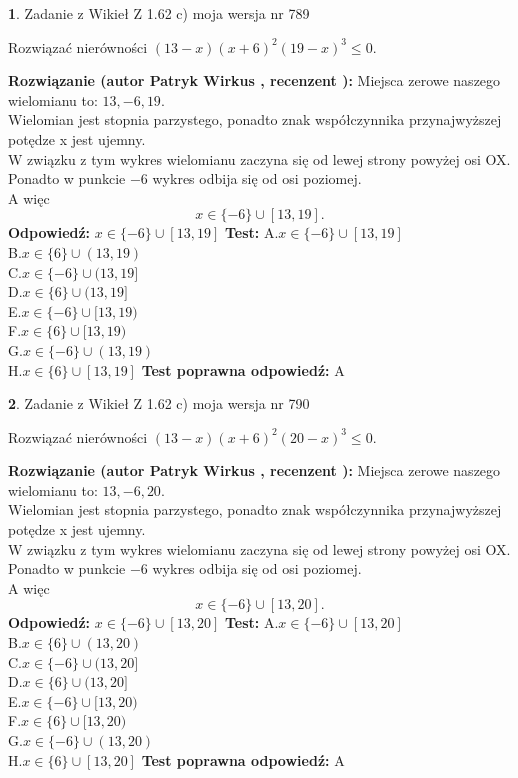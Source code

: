 \documentclass[12pt, a4paper]{article}
\theoremstyle{definition} %
\newtheorem{zad}{}
\newcommand{\zadStart}[1]{\begin{zad}#1\newline}
\newcommand{\zadStop}{\end{zad}}
\newcommand{\rozwStart}[2]{\noindent \textbf{Rozwiązanie (autor #1 , recenzent #2): }\newline}
\newcommand{\rozwStop}{\newline}
\newcommand{\odpStart}{\noindent \textbf{Odpowiedź:}\newline}
\newcommand{\odpStop}{\newline}
\newcommand{\testStart}{\noindent \textbf{Test:}\newline}
\newcommand{\testStop}{\newline}
\newcommand{\kluczStart}{\noindent \textbf{Test poprawna odpowiedź:}\newline}
\newcommand{\kluczStop}{\newline}
\begin{document}
\zadStart{Zadanie z Wikieł Z 1.62 c) moja wersja nr 789}

Rozwiązać nierówności $(13-x)(x+6)^{2}(19-x)^{3}\le0$.
\zadStop
\rozwStart{Patryk Wirkus}{}
Miejsca zerowe naszego wielomianu to: $13, -6, 19$.\\
Wielomian jest stopnia parzystego, ponadto znak współczynnika przy\linebreak najwyższej potędze x jest ujemny.\\ W związku z tym wykres wielomianu zaczyna się od lewej strony powyżej osi OX.\\
Ponadto w punkcie $-6$ wykres odbija się od osi poziomej.\\
A więc $$x \in \{-6\} \cup [13,19].$$
\rozwStop
\odpStart
$x \in \{-6\} \cup [13,19]$
\odpStop
\testStart
A.$x \in \{-6\} \cup [13,19]$\\
B.$x \in \{6\} \cup (13,19)$\\
C.$x \in \{-6\} \cup (13,19]$\\
D.$x \in \{6\} \cup (13,19]$\\
E.$x \in \{-6\} \cup [13,19)$\\
F.$x \in \{6\} \cup [13,19)$\\
G.$x \in \{-6\} \cup (13,19)$\\
H.$x \in \{6\} \cup [13,19]$
\testStop
\kluczStart
A
\kluczStop



\zadStart{Zadanie z Wikieł Z 1.62 c) moja wersja nr 790}

Rozwiązać nierówności $(13-x)(x+6)^{2}(20-x)^{3}\le0$.
\zadStop
\rozwStart{Patryk Wirkus}{}
Miejsca zerowe naszego wielomianu to: $13, -6, 20$.\\
Wielomian jest stopnia parzystego, ponadto znak współczynnika przy\linebreak najwyższej potędze x jest ujemny.\\ W związku z tym wykres wielomianu zaczyna się od lewej strony powyżej osi OX.\\
Ponadto w punkcie $-6$ wykres odbija się od osi poziomej.\\
A więc $$x \in \{-6\} \cup [13,20].$$
\rozwStop
\odpStart
$x \in \{-6\} \cup [13,20]$
\odpStop
\testStart
A.$x \in \{-6\} \cup [13,20]$\\
B.$x \in \{6\} \cup (13,20)$\\
C.$x \in \{-6\} \cup (13,20]$\\
D.$x \in \{6\} \cup (13,20]$\\
E.$x \in \{-6\} \cup [13,20)$\\
F.$x \in \{6\} \cup [13,20)$\\
G.$x \in \{-6\} \cup (13,20)$\\
H.$x \in \{6\} \cup [13,20]$
\testStop
\kluczStart
A
\kluczStop
\end{document}
